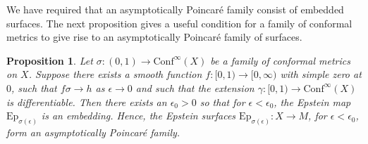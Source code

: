 \documentclass{amsart}
\newtheorem{prop}[thm]{Proposition}
\begin{document}
We have required that an asymptotically Poincar\'e family consist of embedded surfaces.
The next proposition gives a useful condition for a family of conformal metrics to give rise to an asymptotically Poincar\'e family of surfaces. 




\begin{prop}
\label{asym-family-prop}
Let $\sigma: (0,1) \to \mathrm{Conf}^\infty(X)$ be a family of conformal metrics on $X$. 
Suppose there exists a smooth function $f:[0,1) \to [0,\infty)$ with simple zero at $0$, such that $f\sigma \to h$ as $\epsilon \to 0$ and such that the extension $\gamma: [0,1) \to \mathrm{Conf}^\infty(X)$ is differentiable.
Then there exists an $\epsilon_0 >0$ so that for $\epsilon < \epsilon_0$, the Epstein map $\mathrm{Ep}_{\sigma(\epsilon)}$ is an embedding. 
Hence, the Epstein surfaces $\mathrm{Ep}_{\sigma(\epsilon)}:X \to M$, for $\epsilon < \epsilon_0$, form an asymptotically Poincar\'e family. 
\end{prop}
\end{document}
